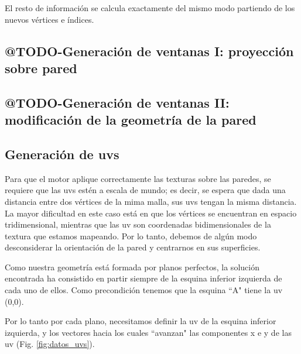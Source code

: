 El resto de información se calcula exactamente del mismo modo partiendo de los nuevos vértices e índices.

\subsection{@TODO-Generación de ventanas I: proyección sobre pared}

\subsection{@TODO-Generación de ventanas II: modificación de la geometría de la pared}

\subsection{Generación de uvs}
Para que el motor aplique correctamente las texturas sobre las paredes, se requiere que las uvs estén a escala de mundo; es decir, se espera que dada una distancia entre dos vértices de la mima malla, sus uvs tengan la misma distancia. La mayor dificultad en este caso está en que los vértices se encuentran en espacio tridimensional, mientras que las uv son coordenadas bidimensionales de la textura que estamos mapeando. Por lo tanto, debemos de algún modo desconsiderar la orientación de la pared y centrarnos en sus superficies.

Como nuestra geometría está formada por planos perfectos, la solución encontrada ha consistido en partir siempre de la esquina inferior izquierda de cada uno de ellos. Como precondición tenemos que la esquina ``A" tiene la uv (0,0).

Por lo tanto por cada plano, necesitamos definir la uv de la esquina inferior izquierda, y los vectores hacia los cuales ``avanzan" las componentes x e y de las uv (Fig. \ref{fig:datos_uvs}).

